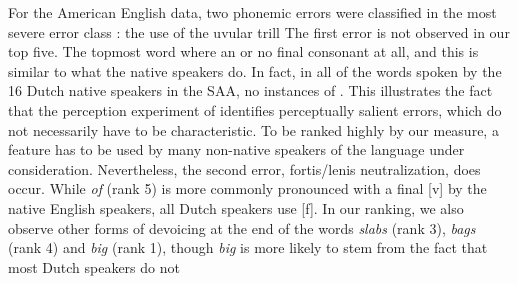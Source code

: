 \documentclass[output=paper]{LSP/langsci}
\begin{document}
For the American English data, two phonemic errors were classified in the most severe error class \citet{van_den_doel_evaluation_2006}: the use of the uvular trill 
The first error is not observed in our top five. The topmost word where an 
or no final consonant at all, and this is similar to what the native speakers do. In fact, in all of the words spoken by the 16 Dutch native speakers in the SAA, no instances of %
\citep{sebregts_sociophonetics_2015}. 
This illustrates the fact that the perception experiment of \citet{van_den_doel_evaluation_2006} identifies perceptually salient errors, which do not necessarily have to be characteristic. To be ranked highly by our measure, a feature has to be used by many non-native speakers of the language under consideration. Nevertheless, the second error, fortis/lenis neutralization, does occur. While \textit{of} (rank 5) is more commonly pronounced with a final [v] by the native English speakers, all Dutch speakers use [f]. In our ranking, we also observe other forms of devoicing at the end of the words \textit{slabs} (rank 3), \textit{bags} (rank 4) and \textit{big} (rank 1), though \textit{big} is more likely to stem from the fact that most Dutch speakers do not %
\end{document}
